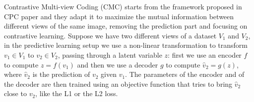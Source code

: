 Contrastive Multi-view Coding (CMC) \cite{tian2020contrastive} starts from the framework proposed in CPC paper and they adapt it to maximize the mutual information between different views of the same image, removing the prediction part and focusing on contrastive learning. Suppose we have two different views of a dataset $V_1$ and $V_2$, in the predictive learning setup we use a non-linear transformation to transform $v_1 \in V_1$ to $v_2 \in V_2$, passing through a latent variable $z$: first we use an encoder $f$ to compute $z = f(v_1)$ and then we use a decoder $g$ to compute $\hat{v}_2 = g(z)$, where $\hat{v}_2$ is the prediction of $v_2$ given $v_1$. The parameters of the encoder and of the decoder are then trained using an objective function that tries to bring $\hat{v}_2$ close to $v_2$, like the L1 or the L2 loss.

